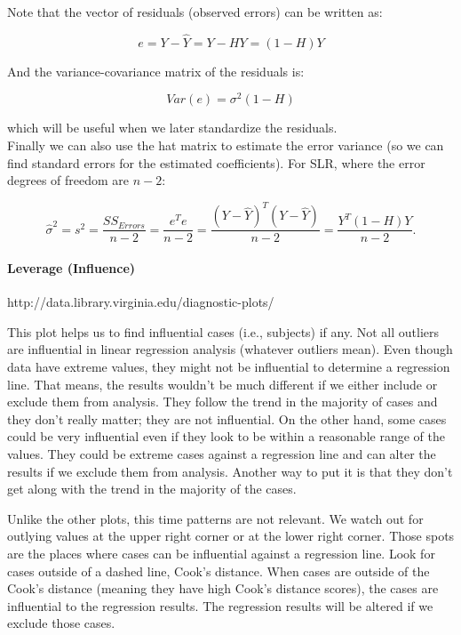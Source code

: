 \documentclass[a4paper, 11pt, twoside]{article}
\begin{document}
Note that the vector of residuals (observed errors) can be written as:

\[e=Y-\hat{Y}=Y-HY=(1-H)Y\]

And the variance-covariance matrix of the residuals is:

\[Var(e)=\sigma^2(1-H)\]

which will be useful when we later standardize the residuals.\\

Finally we can also use the hat matrix to estimate the error variance (so we can find standard errors for the estimated coefficients). For SLR, where the error degrees of freedom are $n-2$:

\[\hat{\sigma}^2 = s^2 = \frac{SS_{Errors}}{n-2} = \frac{e^Te}{n-2} = \frac{(Y-\hat{Y})^T(Y-\hat{Y})}{n-2}=\frac{Y^T(1-H)Y}{n-2}.\]

\paragraph{Leverage (Influence)}

http://data.library.virginia.edu/diagnostic-plots/

This plot helps us to find influential cases (i.e., subjects) if any. Not all outliers are influential in linear regression analysis (whatever outliers mean). Even though data have extreme values, they might not be influential to determine a regression line. That means, the results wouldn’t be much different if we either include or exclude them from analysis. They follow the trend in the majority of cases and they don’t really matter; they are not influential. On the other hand, some cases could be very influential even if they look to be within a reasonable range of the values. They could be extreme cases against a regression line and can alter the results if we exclude them from analysis. Another way to put it is that they don’t get along with the trend in the majority of the cases.

Unlike the other plots, this time patterns are not relevant. We watch out for outlying values at the upper right corner or at the lower right corner. Those spots are the places where cases can be influential against a regression line. Look for cases outside of a dashed line, Cook’s distance. When cases are outside of the Cook’s distance (meaning they have high Cook’s distance scores), the cases are influential to the regression results. The regression results will be altered if we exclude those cases.
\end{document}
